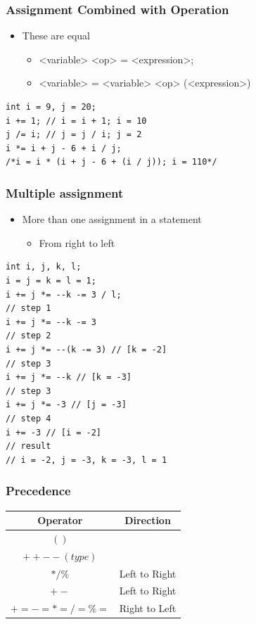 \documentclass{../c-lecture}
\begin{document}
\begin{frame}[fragile]
  \frametitle{Assignment Combined with Operation}
  \begin{itemize}
    \item These are equal
    \begin{itemize}
      \item <variable> <op> = <expression>;
      \item
        <variable> = <variable> <op> (<expression>)
    \end{itemize}
  \end{itemize}
  \begin{verbatim}
int i = 9, j = 20;
i += 1; // i = i + 1; i = 10
j /= i; // j = j / i; j = 2
i *= i + j - 6 + i / j;
/*i = i * (i + j - 6 + (i / j)); i = 110*/
  \end{verbatim}
\end{frame}

\begin{frame}[fragile]
  \frametitle{Multiple assignment}
  \begin{itemize}
    \item More than one assignment in a statement
    \begin{itemize}
      \item From right to left
    \end{itemize}
  \end{itemize}
  \scriptsize
  \begin{verbatim}
int i, j, k, l;
i = j = k = l = 1;
i += j *= --k -= 3 / l;
// step 1
i += j *= --k -= 3
// step 2
i += j *= --(k -= 3) // [k = -2]
// step 3
i += j *= --k // [k = -3]
// step 3
i += j *= -3 // [j = -3]
// step 4
i += -3 // [i = -2]
// result
// i = -2, j = -3, k = -3, l = 1
  \end{verbatim}
\end{frame}

\begin{frame}
  \frametitle{Precedence}
  \begin{table}
  \begin{tabular}{cc}
    \toprule

    Operator &
    Direction \\

    \midrule

    $( )$&
    \\

    \midrule

    $++ -- (type)$ &
    \\

    \midrule

    $* / \%$ &
    Left to Right \\

    \midrule

    $+ -$ &
    Left to Right \\

    \midrule

    $+= -= *= /= \%=$ &
    Right to Left \\

    \bottomrule
  \end{tabular}
  \end{table}
\end{frame}
\end{document}
